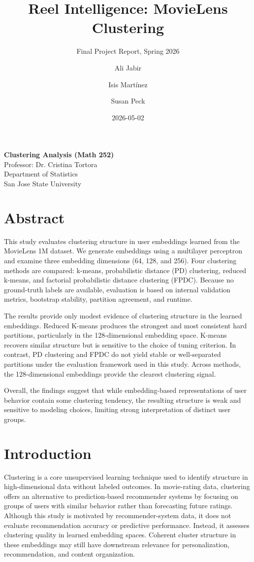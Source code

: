 \documentclass[
  11pt,
  letterpaper,
  DIV=11,
  numbers=noendperiod]{scrartcl}
\title{Reel Intelligence: MovieLens Clustering}
\subtitle{Final Project Report, Spring 2026}
\author{Ali Jabir \and Isis Martínez \and Susan Peck}
\date{2026-05-02}
\begin{document}
\maketitle


\begin{center}
\textbf{Clustering Analysis (Math 252)}\\
Professor: Dr. Cristina Tortora\\
Department of Statistics\\
San Jose State University
\end{center}

\section{Abstract}\label{abstract}

This study evaluates clustering structure in user embeddings learned
from the MovieLens 1M dataset. We generate embeddings using a multilayer
perceptron and examine three embedding dimensions (64, 128, and 256).
Four clustering methods are compared: k-means, probabilistic distance
(PD) clustering, reduced k-means, and factorial probabilistic distance
clustering (FPDC). Because no ground-truth labels are available,
evaluation is based on internal validation metrics, bootstrap stability,
partition agreement, and runtime.

The results provide only modest evidence of clustering structure in the
learned embeddings. Reduced K-means produces the strongest and most
consistent hard partitions, particularly in the 128-dimensional
embedding space. K-means recovers similar structure but is sensitive to
the choice of tuning criterion. In contrast, PD clustering and FPDC do
not yield stable or well-separated partitions under the evaluation
framework used in this study. Across methods, the 128-dimensional
embeddings provide the clearest clustering signal.

Overall, the findings suggest that while embedding-based representations
of user behavior contain some clustering tendency, the resulting
structure is weak and sensitive to modeling choices, limiting strong
interpretation of distinct user groups.

\section{Introduction}\label{sec-introduction}

Clustering is a core unsupervised learning technique used to identify
structure in high-dimensional data without labeled outcomes. In
movie-rating data, clustering offers an alternative to prediction-based
recommender systems by focusing on groups of users with similar behavior
rather than forecasting future ratings. Although this study is motivated
by recommender-system data, it does not evaluate recommendation accuracy
or predictive performance. Instead, it assesses clustering quality in
learned embedding spaces. Coherent cluster structure in these embeddings
may still have downstream relevance for personalization, recommendation,
and content organization.
\end{document}
